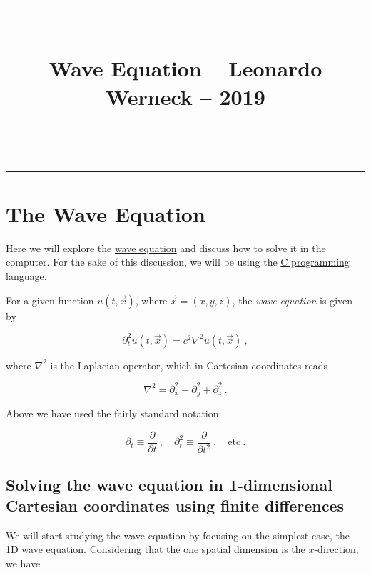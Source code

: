 \documentclass[a4paper,11pt]{article}
\title{\rule{\textwidth}{1pt}\\\textbf{Wave Equation} -- Leonardo Werneck -- 2019\\\rule[0.3cm]{\textwidth}{1pt}}
\author{}
\date{}
\def\cpp{{C\nolinebreak[4]\hspace{-.05em}\raisebox{.4ex}{\tiny\bf ++}}}
\begin{document}
\maketitle
\vspace*{-2.5cm}
\tableofcontents
\listoffigures

\thispagestyle{fancy}

\begin{center}
\rule{\textwidth}{1pt}
\end{center}

\section{The Wave Equation}

Here we will explore the \href{https://en.wikipedia.org/wiki/Wave_equation}{wave equation} and discuss how to solve it in the computer. For the sake of this discussion, we will be using the \href{https://en.wikipedia.org/wiki/C\%2B\%2B}{{\cpp} programming language}.

For a given function $u(t,\vec{x})$, where $\vec{x}=(x,y,z)$, the \emph{wave equation} is given by

\begin{equation}
\partial_{t}^{2}u(t,\vec{x}) = c^{2}\nabla^{2}u(t,\vec{x})\ ,
\end{equation}

\noindent where $\nabla^{2}$ is the Laplacian operator, which in Cartesian coordinates reads

\begin{equation}
\nabla^{2} = \partial_{x}^{2} + \partial_{y}^{2} + \partial_{z}^{2}\ .
\end{equation}

\noindent Above we have used the fairly standard notation:

\begin{equation}
\partial_{t} \equiv \frac{\partial}{\partial t}\ ,\quad \partial_{t}^{2} \equiv \frac{\partial}{\partial t^{2}}\ , \quad \text{etc}\ .
\end{equation}

\subsection{Solving the wave equation in 1-dimensional Cartesian coordinates using finite differences}

We will start studying the wave equation by focusing on the simplest case, the 1D wave equation. Considering that the one spatial dimension is the $x$-direction, we have
\end{document}
